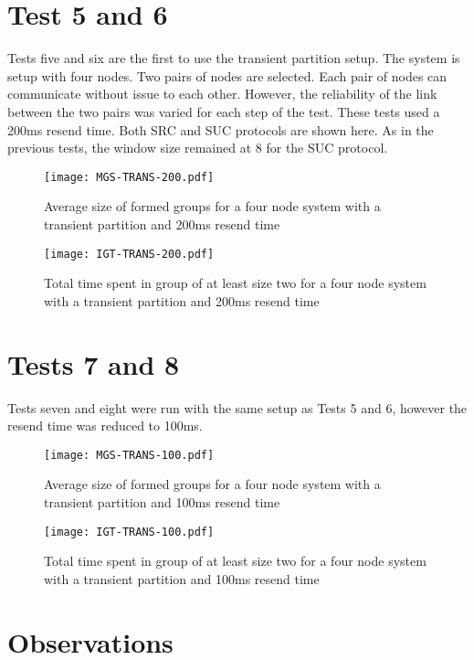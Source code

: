 \section{Test 5 and 6}

Tests five and six are the first to use the transient partition setup. The system is setup with four nodes. Two pairs of nodes are selected. Each pair of nodes can communicate without issue to each other. However, the reliability of the link between the two pairs was varied for each step of the test. These tests used a 200ms resend time. Both SRC and SUC protocols are shown here. As in the previous tests, the window size remained at 8 for the SUC protocol.

\begin{figure}[!h]
\centering
\texttt{[image: MGS-TRANS-200.pdf]}
\caption{Average size of formed groups for a four node system with a transient partition and 200ms resend time}
\label{fig:MGS-TRANS-200}
\end{figure}

\begin{figure}[!h]
\centering
\texttt{[image: IGT-TRANS-200.pdf]}
\caption{Total time spent in group of at least size two for a four node system with a transient partition and 200ms resend time}
\label{fig:IGT-TRANS-200}
\end{figure}

\section{Tests 7 and 8}

Tests seven and eight were run with the same setup as Tests 5 and 6, however the resend time was reduced to 100ms.

\begin{figure}[!h]
\centering
\texttt{[image: MGS-TRANS-100.pdf]}
\caption{Average size of formed groups for a four node system with a transient partition and 100ms resend time}
\label{fig:MGS-TRANS-100}
\end{figure}

\begin{figure}[!h]
\centering
\texttt{[image: IGT-TRANS-100.pdf]}
\caption{Total time spent in group of at least size two for a four node system with a transient partition and 100ms resend time}
\label{fig:IGT-TRANS-100}
\end{figure}

\section{Observations}


